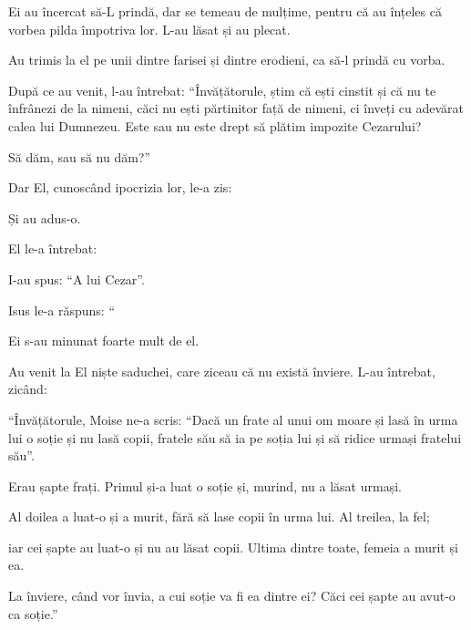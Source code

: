 {\par }{\PP {}Ei au încercat să-L prindă, dar se temeau de mulțime, pentru că au înțeles că vorbea pilda împotriva lor. L-au lăsat și au plecat.

Au trimis la el pe unii dintre farisei și dintre erodieni, ca să-l prindă cu vorba.

După ce au venit, l-au întrebat: “Învățătorule, știm că ești cinstit și că nu te înfrânezi de la nimeni, căci nu ești părtinitor față de nimeni, ci înveți cu adevărat calea lui Dumnezeu. Este sau nu este drept să plătim impozite Cezarului?

Să dăm, sau să nu dăm?”

\par }{\PP Dar El, cunoscând ipocrizia lor, le-a zis:
{}


\par }{\PP {}Și au adus-o.

\par }{\PP El le-a întrebat:
{}

\par }{\PP I-au spus: “A lui Cezar”.


\par }{\PP {}Isus le-a răspuns: “{}

\par }{\PP Ei s-au minunat foarte mult de el.


\par }{\PP {}Au venit la El niște saduchei, care ziceau că nu există înviere. L-au întrebat, zicând:

“Învățătorule, Moise ne-a scris: “Dacă un frate al unui om moare și lasă în urma lui o soție și nu lasă copii, fratele său să ia pe soția lui și să ridice urmași fratelui său”.

Erau șapte frați. Primul și-a luat o soție și, murind, nu a lăsat urmași.

Al doilea a luat-o și a murit, fără să lase copii în urma lui. Al treilea, la fel;

iar cei șapte au luat-o și nu au lăsat copii. Ultima dintre toate, femeia a murit și ea.

La înviere, când vor învia, a cui soție va fi ea dintre ei? Căci cei șapte au avut-o ca soție.”


}
